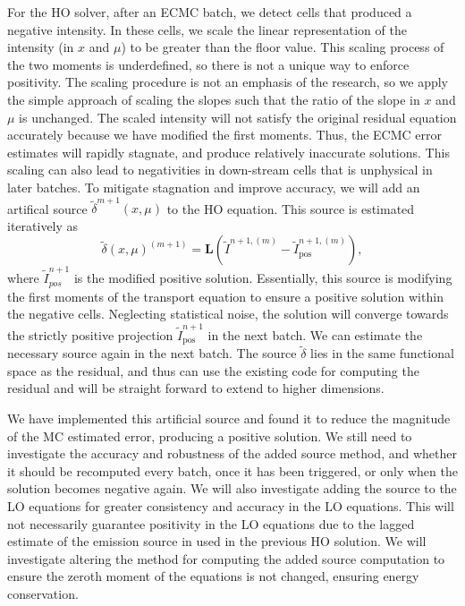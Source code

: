 \documentclass[11pt]{article}
\begin{document}
For the HO solver, after an ECMC batch, we detect cells that produced a negative
intensity. In these cells, we scale the linear representation of the intensity (in
$x$ and $\mu$) to be greater than the floor
value.  This scaling process of the two moments is underdefined, so there is not a unique way to enforce
positivity.  The scaling procedure is not an emphasis of the research, so we apply the simple
approach of scaling the slopes such that the ratio of the slope in $x$ and $\mu$ is
unchanged.  The scaled intensity will not satisfy the original residual equation accurately because we have
modified the first moments.   Thus, the ECMC error estimates will rapidly stagnate,
and produce relatively inaccurate solutions.  This scaling can also lead to
negativities in down-stream cells that is unphysical in later batches.  To mitigate
stagnation and improve accuracy, we will add an artifical source $\tilde\delta^{m+1}(x,\mu)$ to the HO equation.
This source is estimated iteratively as
\begin{equation*}
    \tilde\delta(x,\mu)^{(m+1)} = \mathbf{L}(\tilde{I}^{n+1,(m)} -
    \tilde{I}^{n+1,(m)}_{\text{pos}}),
\end{equation*}
where $\tilde{I}_{pos}^{n+1}$ is the modified positive solution.
Essentially, this source is modifying the first moments of the transport equation to ensure a positive solution within the negative cells.  Neglecting
statistical noise, the solution will converge towards the strictly positive projection
$\tilde{I}_{\text{pos}}^{n+1}$ in the next batch. We can estimate the necessary source again in the next batch.  The source
$\tilde\delta$ lies in the same functional space as the residual, and thus can use
the existing code for computing the residual and will be straight forward to extend
to higher dimensions.  

We have implemented this artificial source and found it to reduce the
magnitude of the MC estimated error, producing a positive solution. We still need to
investigate the accuracy and robustness of the
added source method, and whether it should be recomputed every batch, once it has been
triggered, or only when the
solution becomes negative again.   We will also
investigate adding the source to the LO equations for greater consistency and accuracy in
the LO equations.  This will not
necessarily guarantee positivity in the LO equations due to the lagged estimate of the emission source in
used in the previous HO solution.  We will investigate altering the  method for computing the added source computation to ensure the zeroth moment
of the equations is not changed, ensuring energy conservation.
\end{document}
